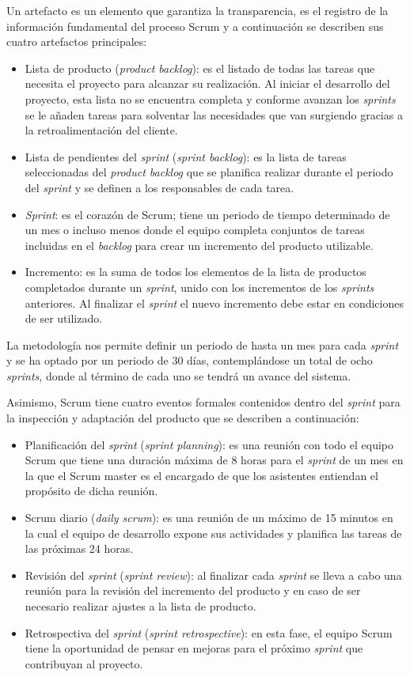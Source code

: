 Un artefacto es un elemento que garantiza la transparencia, es el registro de la información fundamental del proceso Scrum y a continuación se describen sus cuatro artefactos principales:

\begin{itemize}
	\item Lista de producto (\textit{product backlog}):	es el listado de todas las tareas que necesita el proyecto para alcanzar su realización. Al iniciar el desarrollo del
	proyecto, esta lista no se encuentra completa y conforme avanzan los \textit{sprints} se le añaden tareas para solventar las necesidades que van surgiendo gracias a la retroalimentación del cliente.
	\item Lista de pendientes del \textit{sprint} (\textit{sprint backlog}): es la lista de tareas seleccionadas del \textit{product backlog} que se planifica realizar durante el periodo del \textit{sprint} y se definen a los responsables de cada tarea.
	\item \textit{Sprint}: es el corazón de Scrum; tiene un periodo de tiempo determinado de un mes o incluso menos donde el equipo completa conjuntos de tareas incluidas en el \textit{backlog} para crear un incremento del producto utilizable.
	\item Incremento: es la suma de todos los elementos de la lista de productos completados durante un \textit{sprint}, unido con los incrementos de los \textit{sprints} anteriores. Al finalizar el \textit{sprint} el nuevo incremento debe estar en condiciones de ser utilizado.
\end{itemize}

La metodología nos permite definir un periodo de hasta un mes para cada \textit{sprint} y se ha optado por un periodo de 30 días, contemplándose un total de ocho \textit{sprints}, donde al término de cada uno se tendrá un avance del sistema.

Asimismo, Scrum tiene cuatro eventos formales contenidos dentro del \textit{sprint} para la inspección y adaptación del producto que se describen a continuación:
\begin{itemize}
	\item Planificación del \textit{sprint} (\textit{sprint planning}): es una reunión con todo el equipo Scrum que tiene una duración máxima de 8 horas para el \textit{sprint} de un mes en la que el Scrum master es el encargado de que los asistentes entiendan el propósito de dicha reunión.
	\item Scrum diario (\textit{daily scrum}): es una reunión de un máximo de 15 minutos en la cual el equipo de desarrollo expone sus actividades y planifica las tareas de las próximas 24 horas.
	\item Revisión del \textit{sprint} (\textit{sprint review}): al finalizar cada \textit{sprint} se lleva a cabo una reunión para la revisión del incremento del producto y en caso de ser necesario realizar ajustes a la lista de producto.
	\item Retrospectiva del \textit{sprint} (\textit{sprint retrospective}): en esta fase, el equipo Scrum tiene la oportunidad de pensar en mejoras para el próximo \textit{sprint} que contribuyan al proyecto.
\end{itemize}

